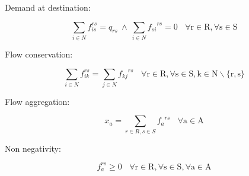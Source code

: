 \documentclass[a4paper, 12pt]{article}
\begin{document}
Demand at destination: 
\begin{large}
\boldmath\begin{equation*}
\sum_{i\in{N}} f_{is}^{rs} = q_{rs}\  \wedge \ \sum_{i\in{N}} {f_{si}}^{rs} = 0 \ \ \ \ \mathrm{\forall{r}\in{R},\forall{s}\in{S}} 
\end{equation*}
\end{large}
Flow conservation: 
\begin{large}
\boldmath\begin{equation*}
\sum_{i\in{N}} f_{ik}^{rs} = \sum_{j\in{N}} {f_{kj}}^{rs} \ \ \ \ \mathrm{\forall{r}\in{R},\forall{s}\in{S},{k}\in{N}{\backslash}{\{}r,s{\}}}
\end{equation*}
\end{large}
Flow aggregation: 
\begin{large}
\boldmath\begin{equation*}
x_{a} = \sum_{r\in{R},s\in{S}} {f_{a}}^{rs} \ \ \ \ \mathrm{\forall{a}\in{A}}
\end{equation*}
\end{large}
Non negativity: 
\begin{large}
\boldmath\begin{equation*}
 f_{a}^{rs} \geq 0 \ \ \ \ \mathrm{\forall{r}\in{R},\forall{s}\in{S},\forall{a}\in{A}} 
\end{equation*}
\end{large}
\end{document}
